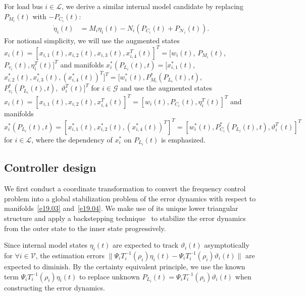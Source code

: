 \documentclass[journal]{IEEEtran}
\newcommand{\GG}{{\mathcal{G}}}
\newcommand{\LL}{{\mathcal{L}}}
\newcommand{\NN}{{\mathcal{N}}}
\newcommand{\VV}{{\mathcal{V}}}
\begin{document}
For load bus $i \in {\LL}$, we derive a similar internal model candidate by replacing $P_{M_i}(t)$ with $-P_{C_i}(t)$:
\begin{align}
\dot{\eta}_{i}(t) &= M_{i} \eta_{i}(t) - N_{i} (P_{C_i}(t)+P_{\NN_i}(t)).
\label{e26.2} 
\end{align}
For notional simplicity, we will use the augmented states $x_i(t) = [x_{i,1}(t),x_{i,2}(t),x_{i,3}(t),x_{i,4}^T(t)]^T=[w_i(t)$, $P_{M_i}(t)$, $P_{v_i}(t), \eta_i^T(t)]^T$ and manifolds $x_i^*(P_{L_i}(t),t) = [x_{i,1}^*(t)$, $x_{i,2}^*(t),x_{i,3}^*(t),(x_{i,4}^*(t))^T]^T= [w_i^*(t), P_{M_i}^*(P_{L_i}(t),t),$ $P_{v_i}^*(P_{L_i}(t),t),$ $\vartheta_i^T(t)]^T$ for $i \in {\GG}$ and use the augmented states $x_i(t) = [x_{i,1}(t),x_{i,2}(t),x_{i,4}^T(t)]^T = [w_i(t), P_{C_i}(t), \eta_i^T(t)]^T$ and manifolds $x_i^*(P_{L_i}(t),t) =[x_{i,1}^*(t),x_{i,2}^*(t),(x_{i,4}^*(t))^T]^T= [w_i^*(t), P_{C_i}^*(P_{L_i}(t),t), \vartheta_i^T(t)]^T$ for $i \in {\LL}$, where the dependency of $x_i^*$ on $P_{L_i}(t)$ is emphasized.

\subsection{Controller design}\label{sec:coo1}
We first conduct a coordinate transformation to convert the frequency control problem into a global stabilization
problem of the error dynamics with respect to manifolds~\eqref{e19.03} and~\eqref{e19.04}.
We make use of its unique lower triangular structure and apply a backstepping technique~\cite{KKK:95} to stabilize the error dynamics from the outer state to the inner state progressively.

Since internal model states $\eta_{i}(t)$ are expected to track $\vartheta_{i}(t)$ asymptotically for $\forall i \in {\VV}$, the estimation errors $\|\Psi_{i} T_{i}^{-1}(\rho_i)\eta_{i}(t)-\Psi_{i} T_{i}^{-1}(\rho_i)\vartheta_{i}(t)\|$ are expected to diminish.
By the certainty equivalent principle, we use the known term $\Psi_{i} T_{i}^{-1}(\rho_i)\eta_{i}(t)$
to replace unknown $P_{L_i}(t)=\Psi_{i} T_{i}^{-1}(\rho_i)\vartheta_{i}(t)$ when constructing the error dynamics.
\end{document}
